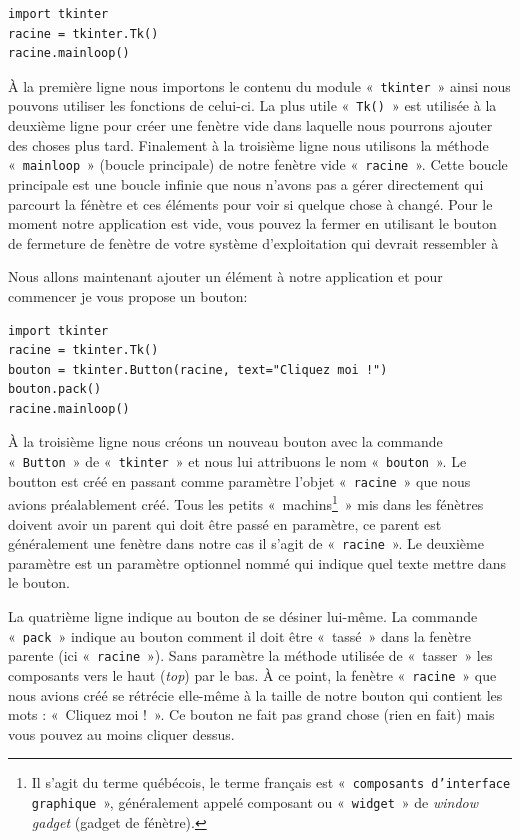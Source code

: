 \begin{Verbatim}[frame=single,rulecolor=\color{mbleu}, label=à taper et sauver dans un nouveau fichier .py]
import tkinter
racine = tkinter.Tk()
racine.mainloop()
\end{Verbatim}

À la première ligne nous importons le contenu du module «~\texttt{tkinter}~» ainsi nous pouvons utiliser les fonctions de celui-ci. La plus utile «~\texttt{Tk()}~»  est utilisée à la deuxième ligne pour créer une fenètre vide dans laquelle nous pourrons ajouter des choses plus tard. Finalement à la troisième ligne nous utilisons la méthode «~\texttt{mainloop}~» (boucle principale) de notre fenètre vide «~\texttt{racine}~». Cette boucle principale est une boucle infinie que nous n'avons pas a gérer directement qui parcourt la fénètre et ces éléments pour voir si quelque chose à changé. Pour le moment notre application est vide, vous pouvez la fermer en utilisant le bouton de fermeture de fenètre de votre système d'exploitation qui devrait ressembler à  %

Nous allons maintenant ajouter un élément à notre application et pour commencer je vous propose un bouton:
\begin{Verbatim}[frame=single,rulecolor=\color{mbleu}, label=à taper et sauver dans un nouveau fichier .py]
import tkinter
racine = tkinter.Tk()
bouton = tkinter.Button(racine, text="Cliquez moi !")
bouton.pack()
racine.mainloop()
\end{Verbatim}

À la troisième ligne nous créons un nouveau bouton avec la commande «~\texttt{Button}~» de «~\texttt{tkinter}~» et nous lui attribuons le nom «~\texttt{bouton}~». Le boutton est créé en passant comme paramètre l'objet «~\texttt{racine}~»  que nous avions préalablement créé. Tous les petits «~machins\footnote{Il s'agit du terme québécois, le terme français est «~\texttt{composants d'interface graphique}~», généralement appelé composant ou  «~\texttt{widget}~»  de \emph{window gadget} (gadget de fénètre).}~» mis dans les fénètres doivent avoir un parent qui doit être passé en paramètre, ce parent est généralement une fenètre dans notre cas il s'agit de «~\texttt{racine}~». Le deuxième paramètre est un paramètre optionnel nommé qui indique quel texte mettre dans le bouton.

La quatrième ligne indique au bouton de se désiner lui-même. La commande «~\texttt{pack}~» indique au bouton comment il doit être «~tassé~»  dans la fenètre parente (ici «~\texttt{racine}~»). Sans paramètre la méthode utilisée de «~tasser~» les composants vers le haut (\emph{top}) par le bas. À ce point, la fenètre «~\texttt{racine}~» que nous avions créé se rétrécie elle-même à la taille de notre bouton qui contient les mots : «~Cliquez moi !~». Ce bouton ne fait pas grand chose (rien en fait) mais vous pouvez au moins cliquer dessus. 

